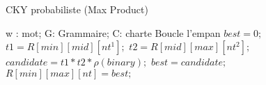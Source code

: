\documentclass{article}
\begin{document}
\begin{algorithm}
\caption{CKY probabiliste (Max Product)}
\label{cky}
	\begin{algorithmic}
		 \Comment w : mot; G: Grammaire; C: charte
			 \Comment Boucle  l'empan
						\State $best = 0;$
								\State $t1 = R[min][mid][nt^1];$ 
								\State $t2 = R[mid][max][nt^2];$
								\State $candidate = t1 * t2 * \rho(binary);$
									\State $best = candidate;$
								\EndIf
							\EndFor
						\EndFor
						\State $R[min][max][nt] = best;$
					\EndFor
				\EndFor
			\EndFor
		\EndFunction
	\end{algorithmic}
\end{algorithm}
\end{document}
